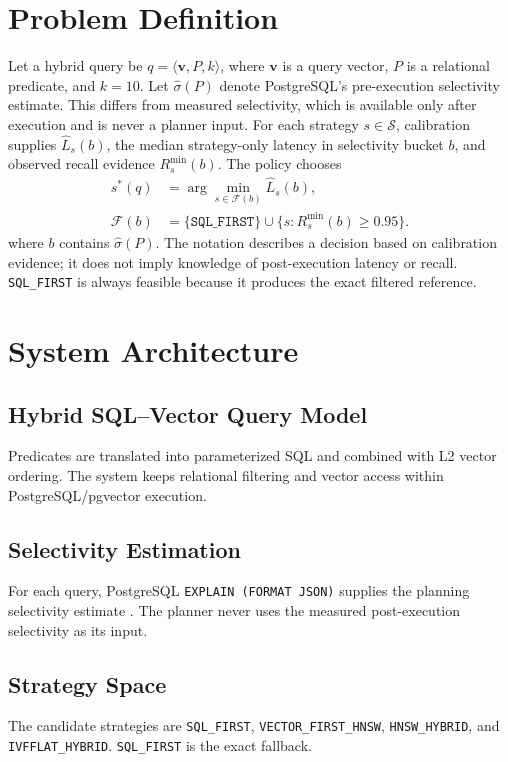 \documentclass[conference]{IEEEtran}
\begin{document}
\section{Problem Definition}
Let a hybrid query be $q=\langle \mathbf{v},P,k\rangle$, where $\mathbf{v}$ is a query vector, $P$ is a relational predicate, and $k=10$. Let $\hat{\sigma}(P)$ denote PostgreSQL's pre-execution selectivity estimate. This differs from measured selectivity, which is available only after execution and is never a planner input. For each strategy $s\in\mathcal{S}$, calibration supplies $\widehat{L}_s(b)$, the median strategy-only latency in selectivity bucket $b$, and observed recall evidence $R^{\min}_s(b)$. The policy chooses
\begin{align}
s^*(q) &= \arg\min_{s\in\mathcal{F}(b)}\widehat{L}_s(b), \\
\mathcal{F}(b) &= \{\texttt{SQL\_FIRST}\}\cup
\{s:R^{\min}_s(b)\geq0.95\}.
\end{align}
where $b$ contains $\hat{\sigma}(P)$. The notation describes a decision based on calibration evidence; it does not imply knowledge of post-execution latency or recall. \texttt{SQL\_FIRST} is always feasible because it produces the exact filtered reference.

\section{System Architecture}
\subsection{Hybrid SQL--Vector Query Model}
Predicates are translated into parameterized SQL and combined with L2 vector ordering. The system keeps relational filtering and vector access within PostgreSQL/pgvector execution.

\subsection{Selectivity Estimation}
For each query, PostgreSQL \texttt{EXPLAIN (FORMAT JSON)} supplies the planning selectivity estimate \cite{postgresql16}. The planner never uses the measured post-execution selectivity as its input.

\subsection{Strategy Space}
The candidate strategies are \texttt{SQL\_FIRST}, \texttt{VECTOR\_FIRST\_HNSW}, \texttt{HNSW\_HYBRID}, and \texttt{IVFFLAT\_HYBRID}. \texttt{SQL\_FIRST} is the exact fallback.
\end{document}
